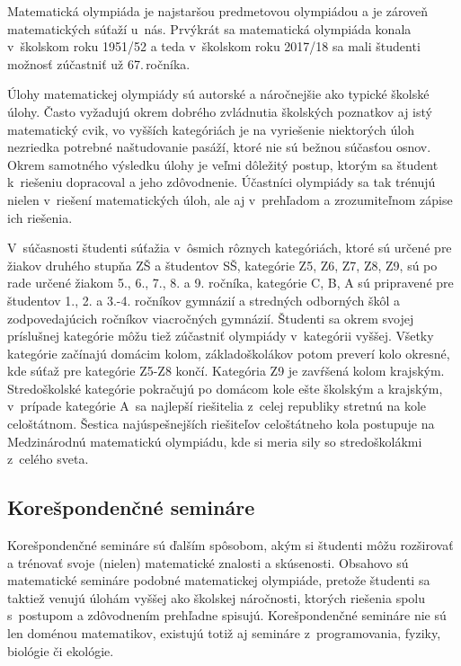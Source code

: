 Matematická olympiáda je najstaršou predmetovou olympiádou a je zároveň  matematických súťaží u~nás. Prvýkrát sa matematická olympiáda konala v~školskom roku 1951/52 a teda v~školskom roku 2017/18 sa mali študenti možnosť zúčastniť už 67.\,ročníka.

Úlohy matematickej olympiády sú autorské a náročnejšie ako typické školské úlohy. Často vyžadujú okrem dobrého zvládnutia školských poznatkov aj istý matematický cvik, vo vyšších kategóriách je na vyriešenie niektorých úloh nezriedka potrebné naštudovanie pasáží, ktoré nie sú bežnou súčasťou osnov. Okrem samotného výsledku úlohy je veľmi dôležitý postup, ktorým sa študent k~riešeniu dopracoval a jeho zdôvodnenie. Účastníci olympiády sa tak trénujú nielen v~riešení matematických úloh, ale aj v~prehľadom a zrozumiteľnom zápise ich riešenia.

V~súčasnosti študenti súťažia v~ôsmich rôznych kategóriách, ktoré sú určené pre žiakov druhého stupňa ZŠ a študentov SŠ, kategórie Z5, Z6, Z7, Z8, Z9, sú po rade určené žiakom 5., 6., 7., 8. a 9. ročníka, kategórie C, B, A sú pripravené pre študentov 1., 2. a 3.-4. ročníkov gymnázií a stredných odborných škôl a zodpovedajúcich ročníkov viacročných gymnázií. Študenti sa okrem svojej príslušnej kategórie môžu tiež zúčastniť olympiády v~kategórii vyššej. Všetky kategórie začínajú domácim kolom, základoškolákov potom preverí kolo okresné, kde súťaž pre kategórie Z5-Z8 končí. Kategória Z9 je zavŕšená kolom krajským. Stredoškolské kategórie pokračujú po domácom kole ešte školským a krajským, v~prípade kategórie A~sa najlepší riešitelia z~celej republiky stretnú na kole celoštátnom. Šestica najúspešnejších riešiteľov celoštátneho kola postupuje na Medzinárodnú matematickú olympiádu, kde si meria sily so stredoškolákmi z~celého sveta.

\subsection*{Korešpondenčné semináre}

Korešpondenčné semináre sú ďalším spôsobom, akým si študenti môžu rozširovať a trénovať svoje (nielen) matematické znalosti a skúsenosti. Obsahovo sú matematické semináre podobné matematickej olympiáde, pretože študenti sa taktiež venujú úlohám vyššej ako školskej náročnosti, ktorých riešenia spolu s~postupom a zdôvodnením prehľadne spisujú. Korešpondenčné semináre nie sú len doménou matematikov, existujú totiž aj semináre z~programovania, fyziky, biológie či ekológie.

